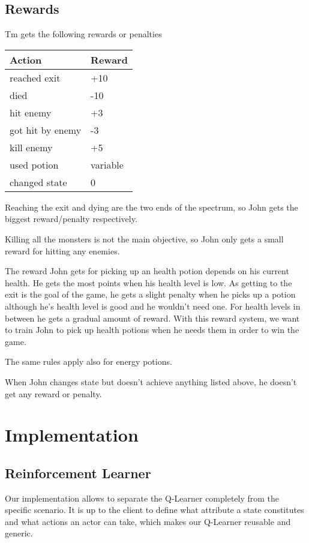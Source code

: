 \documentclass[a4paper,10pt]{scrartcl}
\begin{document}
\subsection{Rewards}
Tm gets the following rewards or penalties
\begin{center}
\begin{tabular}{l|l}
Action & Reward \\
\hline
reached exit & +10 \\
died & -10 \\
hit enemy & +3 \\
got hit by enemy & -3 \\
kill enemy & +5 \\
used potion & variable\\
changed state & 0
\end{tabular}
\end{center}

Reaching the exit and dying are the two ends of the spectrum, so John gets the biggest reward/penalty respectively.

Killing all the monsters is not the main objective, so John only gets a small reward for hitting any enemies.

The reward John gets for picking up an health potion depends on his current health. He gets the most points when his health level is low. As getting to the exit is the goal of the game, he gets a slight penalty when he picks up a potion although he's health level is good and he wouldn't need one. 
For health levels in between he gets a gradual amount of reward. 
With this reward system, we want to train John to pick up health potions when he needs them in order to win the game.
 
The same rules apply also for energy potions. 

When John changes state but doesn't achieve anything listed above, he doesn't get any reward or penalty. 


\section{Implementation}\label{sec:implementation}
\subsection{Reinforcement Learner}
Our implementation allows to separate the Q-Learner completely from the specific scenario. It is up to the client to define what attribute a state constitutes and what actions an actor can take, which makes our Q-Learner reusable and generic. 
\end{document}
